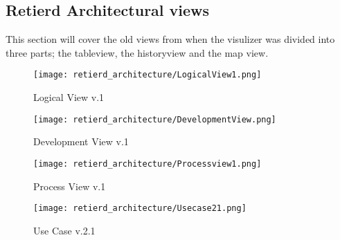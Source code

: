 \documentclass[../document]{subfiles}
\begin{document}
\subsection{Retierd Architectural views}
This section will cover the old views from when the visulizer was divided into three parts; the tableview, the historyview and the map view. 


\begin{figure}[H]
	\centering
	\texttt{[image: retierd\_architecture/LogicalView1.png]}
	\caption{Logical View v.1}
\end{figure}

\begin{figure}[H]
	\centering
	\texttt{[image: retierd\_architecture/DevelopmentView.png]}
	\caption{Development View v.1}
\end{figure}


\begin{figure}[H]
	\centering
	\texttt{[image: retierd\_architecture/Processview1.png]}
	\caption{Process View v.1}
\end{figure}

\begin{figure}[H]
	\centering
	\texttt{[image: retierd\_architecture/Usecase21.png]}
	\caption{Use Case v.2.1}
\end{figure}
\end{document}
